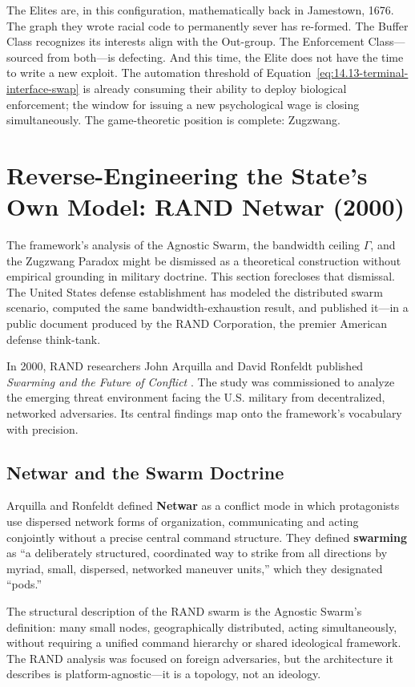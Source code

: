 The Elites are, in this configuration, mathematically back in Jamestown, 1676. The graph they wrote racial code to permanently sever has re-formed. The Buffer Class recognizes its interests align with the Out-group. The Enforcement Class---sourced from both---is defecting. And this time, the Elite does not have the time to write a new exploit. The automation threshold of Equation~\eqref{eq:14.13-terminal-interface-swap} is already consuming their ability to deploy biological enforcement; the window for issuing a new psychological wage is closing simultaneously. The game-theoretic position is complete: Zugzwang.

\section{Reverse-Engineering the State's Own Model: RAND Netwar (2000)}
\label{sec:rand_netwar}

The framework's analysis of the Agnostic Swarm, the bandwidth ceiling $\Gamma$, and the Zugzwang Paradox might be dismissed as a theoretical construction without empirical grounding in military doctrine. This section forecloses that dismissal. The United States defense establishment has modeled the distributed swarm scenario, computed the same bandwidth-exhaustion result, and published it---in a public document produced by the RAND Corporation, the premier American defense think-tank.

In 2000, RAND researchers John Arquilla and David Ronfeldt published \textit{Swarming and the Future of Conflict} \cite{arquilla_ronfeldt_netwar}. The study was commissioned to analyze the emerging threat environment facing the U.S. military from decentralized, networked adversaries. Its central findings map onto the framework's vocabulary with precision.

\subsection{Netwar and the Swarm Doctrine}

Arquilla and Ronfeldt defined \textbf{Netwar} as a conflict mode in which protagonists use dispersed network forms of organization, communicating and acting conjointly without a precise central command structure. They defined \textbf{swarming} as ``a deliberately structured, coordinated way to strike from all directions by myriad, small, dispersed, networked maneuver units,'' which they designated ``pods.''

The structural description of the RAND swarm is the Agnostic Swarm's definition: many small nodes, geographically distributed, acting simultaneously, without requiring a unified command hierarchy or shared ideological framework. The RAND analysis was focused on foreign adversaries, but the architecture it describes is platform-agnostic---it is a topology, not an ideology.


